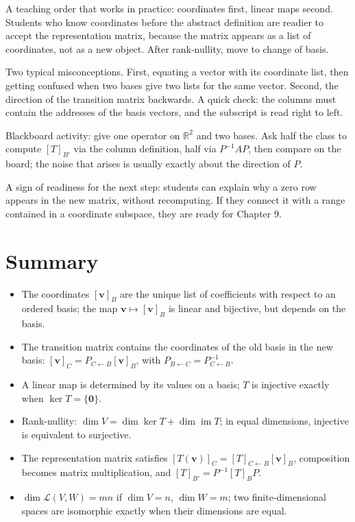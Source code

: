 \begin{untukdosen}
A teaching order that works in practice: coordinates first, linear maps second. Students who
know
coordinates before the abstract definition are readier to accept the representation matrix, because
the matrix appears as a list of coordinates, not as a new object. After rank-nullity, move to
change of basis.

Two typical misconceptions. First, equating a vector with its coordinate list, then getting confused
when two bases give two lists for the same vector. Second, the direction of the transition matrix
backwards. A quick check: the columns must contain the addresses of the basis vectors, and the subscript is read
right to left.

Blackboard activity: give one operator on $\mathbb{R}^{2}$ and two bases. Ask half the
class to compute $[T]_{B'}$ via the column definition, half via $P^{-1}AP$, then compare
on
the board; the noise that arises is usually exactly about the direction of $P$.

A sign of readiness for the next step: students can explain why a zero row appears in the new
matrix, without recomputing. If they connect it with a range
contained in a coordinate subspace, they are ready for Chapter 9.
\end{untukdosen}

\section{Summary}

\begin{ringkasan}
\begin{itemize}
  \item The coordinates $[\mathbf{v}]_{B}$ are the unique list of coefficients with respect to an ordered basis;
        the map $\mathbf{v}\mapsto[\mathbf{v}]_{B}$ is linear and bijective, but depends on the
        basis.
  \item The transition matrix contains the coordinates of the old basis in the new basis:
        $[\mathbf{v}]_{C}=P_{C\leftarrow B}[\mathbf{v}]_{B}$, with
        $P_{B\leftarrow C}=P_{C\leftarrow B}^{-1}$.
  \item A linear map is determined by its values on a basis; $T$ is injective exactly when
        $\ker T=\{\mathbf{0}\}$.
  \item Rank-nullity: $\dim V=\dim\ker T+\dim\operatorname{im}T$; in equal dimensions,
        injective is equivalent to surjective.
  \item The representation matrix satisfies
$[T(\mathbf{v})]_{C}=[T]_{C\leftarrow B}[\mathbf{v}]_{B}$, composition becomes matrix
        multiplication, and $[T]_{B'}=P^{-1}[T]_{B}P$.
  \item $\dim\mathcal{L}(V,W)=mn$ if $\dim V=n$, $\dim W=m$; two finite-dimensional spaces
        are isomorphic exactly when their dimensions are equal.
\end{itemize}
\end{ringkasan}

